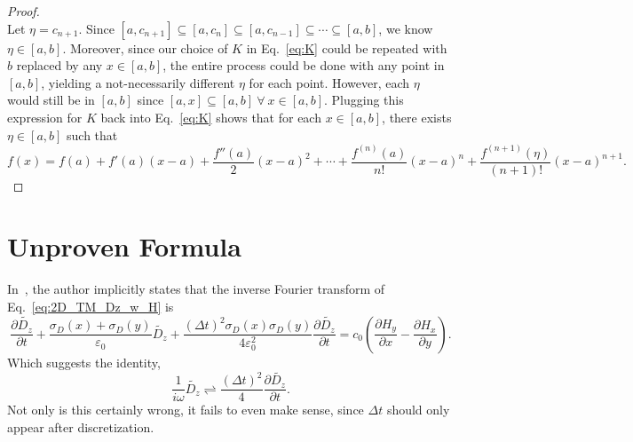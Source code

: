 \documentclass[12pt,twocolumn]{article}
\begin{document}
\begin{proof}
\begin{equation}
\end{equation}
Let $\eta=c_{n+1}$. Since $[a,c_{n+1}]\subseteq[a,c_n]\subseteq[a,c_{n-1}]\subseteq\cdots\subseteq[a,b]$, we know $\eta\in[a,b]$. Moreover, since our choice of $K$ in Eq.~\ref{eq:K} could be repeated with $b$ replaced by any $x\in[a,b]$, the entire process could be done with any point in $[a,b]$, yielding a not-necessarily different $\eta$ for each point. However, each $\eta$ would still be in $[a,b]$ since $[a,x]\subseteq[a,b]~\forall~x\in[a,b]$. Plugging this expression for $K$ back into Eq.~\ref{eq:K} shows that for each $x\in[a,b]$, there exists $\eta\in[a,b]$ such that
\begin{equation}
f(x) = f(a) + f'(a)(x-a) + \frac{f''(a)}{2}(x-a)^2 + \cdots + \frac{f^{(n)}(a)}{n!}(x-a)^n + \frac{f^{(n+1)}(\eta)}{(n+1)!}(x-a)^{n+1}.
\end{equation}
\end{proof}
\newpage
\section{Unproven Formula}
\label{ap:Sullivan}
In~\cite{Sullivan00}, the author implicitly states that the inverse Fourier transform of Eq.~\ref{eq:2D_TM_Dz_w_H} is
\begin{equation}
\label{eq:Sullivan_continuous1}
\frac{\partial \tilde{D_z}}{\partial t} + \frac{\sigma_D(x)+\sigma_D(y)}{\varepsilon_0}\tilde{D_z} + \frac{(\Delta t)^2\sigma_D(x)\sigma_D(y)}{4\varepsilon_0^2}\frac{\partial \tilde{D_z}}{\partial t} = c_0\left(\frac{\partial H_y}{\partial x}-\frac{\partial H_x}{\partial y}\right).
\end{equation}
Which suggests the identity,
\begin{equation*}
\frac{1}{i\omega}\tilde{D_z} \rightleftharpoons \frac{(\Delta t)^2}{4} \frac{\partial \tilde{D_z}}{\partial t}.
\end{equation*}
Not only is this certainly wrong, it fails to even make sense, since $\Delta t$ should only appear after discretization.
\end{document}
